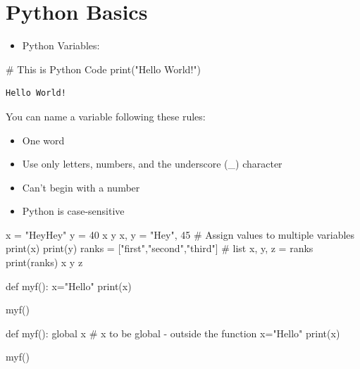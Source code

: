 \documentclass[
  letterpaper,
  DIV=11,
  numbers=noendperiod]{scrreprt}
\newenvironment{Shaded}{\begin{snugshade}}{\end{snugshade}}
\newcommand{\BuiltInTok}[1]{\textcolor[rgb]{0.00,0.23,0.31}{#1}}
\newcommand{\CommentTok}[1]{\textcolor[rgb]{0.37,0.37,0.37}{#1}}
\newcommand{\DecValTok}[1]{\textcolor[rgb]{0.68,0.00,0.00}{#1}}
\newcommand{\KeywordTok}[1]{\textcolor[rgb]{0.00,0.23,0.31}{#1}}
\newcommand{\NormalTok}[1]{\textcolor[rgb]{0.00,0.23,0.31}{#1}}
\newcommand{\OperatorTok}[1]{\textcolor[rgb]{0.37,0.37,0.37}{#1}}
\newcommand{\StringTok}[1]{\textcolor[rgb]{0.13,0.47,0.30}{#1}}
\providecommand{\tightlist}{%
  \setlength{\itemsep}{0pt}\setlength{\parskip}{0pt}}\usepackage{longtable,booktabs,array}
\begin{document}
\hypertarget{python-basics}{%
\section*{Python Basics}\label{python-basics}}


\begin{itemize}
\tightlist
\item
  Python Variables:
\end{itemize}

\begin{Shaded}
\begin{Highlighting}[]
\CommentTok{\# This is Python Code}
\BuiltInTok{print}\NormalTok{(}\StringTok{"Hello World!"}\NormalTok{)}
\end{Highlighting}
\end{Shaded}

\begin{verbatim}
Hello World!
\end{verbatim}

You can name a variable following these rules:

\begin{itemize}
\tightlist
\item
  One word
\item
  Use only letters, numbers, and the underscore (\_) character
\item
  Can't begin with a number
\item
  Python is case-sensitive
\end{itemize}

\begin{Shaded}
\begin{Highlighting}[]
\NormalTok{x }\OperatorTok{=} \StringTok{"HeyHey"}
\NormalTok{y }\OperatorTok{=} \DecValTok{40}
\NormalTok{x}
\NormalTok{y}
\NormalTok{x, y }\OperatorTok{=} \StringTok{"Hey"}\NormalTok{, }\DecValTok{45} \CommentTok{\# Assign values to multiple variables}
\BuiltInTok{print}\NormalTok{(x)}
\BuiltInTok{print}\NormalTok{(y)}
\NormalTok{ranks }\OperatorTok{=}\NormalTok{ [}\StringTok{"first"}\NormalTok{,}\StringTok{"second"}\NormalTok{,}\StringTok{"third"}\NormalTok{] }\CommentTok{\# list}
\NormalTok{x, y, z }\OperatorTok{=}\NormalTok{ ranks}
\BuiltInTok{print}\NormalTok{(ranks)}
\NormalTok{x}
\NormalTok{y}
\NormalTok{z}

\KeywordTok{def}\NormalTok{ myf():}
\NormalTok{  x}\OperatorTok{=}\StringTok{"Hello"}
  \BuiltInTok{print}\NormalTok{(x)}
  
\NormalTok{myf()}

\KeywordTok{def}\NormalTok{ myf():}
  \KeywordTok{global}\NormalTok{ x }\CommentTok{\# x to be global {-} outside the function}
\NormalTok{  x}\OperatorTok{=}\StringTok{"Hello"}
  \BuiltInTok{print}\NormalTok{(x)}
  
\NormalTok{myf()}
\end{Highlighting}
\end{Shaded}
\end{document}
